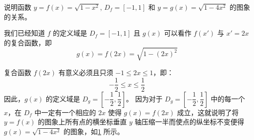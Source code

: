 \begin{example}
  说明函数 $y=f(x)=\sqrt{1-x^2}$, $D_f=[-1,1]$ 和 $y=g(x)=\sqrt{1-4x^2}$ 的图象的关系。
\end{example}

\begin{solution}
我们已经知道 $f$ 的定义域是 $D_f=[-1,1]$ 且 $g(x)$ 可以看作 $f(x')$ 与 $x'=2x$ 的复合函数，即
\[g(x)=f(2x)=\sqrt{1-(2x)^2}\]

复合函数 $f(2x)$ 有意义必须且只须 $-1\leqslant 2x\leqslant 1$，即：
\[-\dfrac{1}{2}\leqslant x\leqslant \dfrac{1}{2}\]
因此，$g(x)$ 的定义域是 $D_g=\left[-\dfrac{1}{2},\dfrac{1}{2}\right]$。
因为对于 $D_g=\left[-\dfrac{1}{2},\dfrac{1}{2}\right]$ 中的每一个 $x$，在 $D_f$ 中一定有一个相应的 $2x$ 使得 $g(x)=f(2x)$ 成立，这就说明了将 $y=f(x)$ 的图象上所有点的横坐标垂直 $y$ 轴压缩一半而使点的纵坐标不变便得 $g(x)=\sqrt{1-4x^2}$ 的图象，如\cref{fig:function_transform} 所示。

\begin{figure}
    \caption{}\label{fig:function_transform}
\end{figure}
\end{solution}

